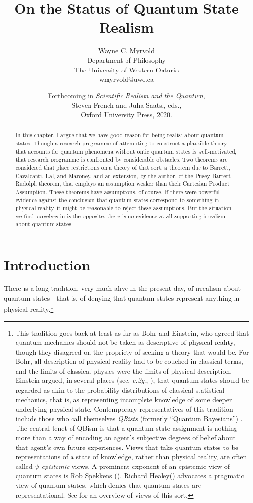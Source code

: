 \documentclass[12pt]{article}
\title{On the Status of Quantum State Realism}
\author{Wayne C. Myrvold \\
 Department of Philosophy \\
 The University of Western Ontario \\
 wmyrvold@uwo.ca}
\date{Forthcoming in \emph{Scientific Realism and the Quantum}, \\ Steven French and Juha Saatsi, eds., \\ Oxford University Press, 2020.}
\begin{document}
 \maketitle
 
 \begin{abstract}
 In this chapter,  I argue that we have good reason for being realist about quantum states.  Though a research programme of attempting to construct a plausible theory that accounts for quantum phenomena without ontic quantum states is well-motivated, that research programme is confronted by considerable obstacles.  Two theorems are considered that place restrictions on a theory of that sort: a theorem due to Barrett, Cavalcanti, Lal, and Maroney, and an extension, by the author, of the Pusey Barrett Rudolph theorem, that employs an assumption weaker than their Cartesian Product Assumption. These theorems have assumptions, of course. If there were powerful evidence against the conclusion that quantum states correspond to something in physical reality, it might be reasonable to reject these assumptions. But the situation we find ourselves in is the opposite: there is no evidence at all supporting irrealism about quantum states.
\end{abstract}


\newpage

\section{Introduction}  There is a long tradition, very much alive in the present day, of irrealism  about quantum states---that is, of denying that quantum states represent anything in physical reality.\footnote{This tradition goes back at least as far as Bohr and Einstein, who  agreed that quantum mechanics should not be taken as descriptive of physical reality, though they disagreed on the propriety of  seeking a theory that would be.  For Bohr, all description of physical reality had to be couched in classical terms, and the limits of classical physics were the limits of physical description.  Einstein argued, in several places (see, \emph{e.2g.}, \citealt{EinsteinPR}), that quantum states should be regarded as akin to the probability distributions of classical statistical mechanics, that is, as representing incomplete knowledge of some deeper underlying physical state.    Contemporary representatives of this tradition include those who call themselves \emph{QBists} (formerly ``Quantum Bayesians'') \citep{CFSQB,FMSQB,FSQB}.  The central tenet of QBism is that a quantum state assignment is nothing more than a way of encoding an agent's  subjective degrees of belief about that agent's own future experiences.  Views that take quantum states to be representations of a state of knowledge, rather than physical reality, are often called \emph{$\psi$-epistemic} views.  A prominent exponent of an epistemic view of quantum states is Rob Spekkens (\citeyear{SpekkensToy,SpekkensPsiOnt}). Richard  Healey(\citeyear{HealeyPragQM,HealeyBridges,HealeyRevolution,HealeyPQR}) advocates a pragmatic view of quantum states, which denies that quantum states are representational.  See \citet{sep-quantum-bayesian} for an overview of views of this sort.}
\end{document}
